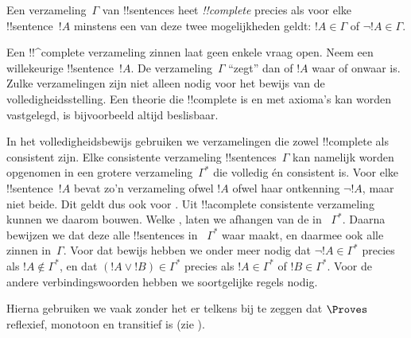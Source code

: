 \documentclass[../../../include/open-logic-section]{subfiles}
\begin{document}
      {}
      {}
      

\begin{defn}
 Een verzameling~$\Gamma$ van !!{sentence}s heet
\emph{!!{complete}} precies als voor elke !!{sentence}~$!A$ minstens een
van deze twee mogelijkheden geldt: $!A \in \Gamma$ of
$\lnot !A \in \Gamma$.
\end{defn}

\begin{explain}
Een !!^{complete} verzameling zinnen laat geen enkele vraag open. Neem
een willekeurige !!{sentence}~$!A$. De verzameling~$\Gamma$ ``zegt'' dan
of $!A$ waar of onwaar is. Zulke verzamelingen zijn niet alleen nodig
voor het bewijs van de volledigheidsstelling. Een theorie die !!{complete}
is en met axioma's kan worden vastgelegd, is bijvoorbeeld altijd
beslisbaar.
\end{explain}

\begin{explain}
In het volledigheidsbewijs gebruiken we verzamelingen die zowel
!!{complete} als consistent zijn. Elke consistente verzameling
!!{sentence}s~$\Gamma$ kan namelijk worden opgenomen in een grotere
verzameling~$\Gamma^*$ die volledig én consistent is. Voor elke
!!{sentence}~$!A$ bevat zo'n verzameling ofwel $!A$ ofwel haar ontkenning
$\lnot !A$, maar niet beide. Dit geldt dus ook voor
. Uit
!!a{complete} consistente verzameling kunnen we daarom
 bouwen. Welke
, laten we afhangen van de
 in
~$\Gamma^*$. Daarna bewijzen we dat deze
 alle !!{sentence}s in
~$\Gamma^*$ waar maakt, en daarmee ook alle zinnen in~$\Gamma$. Voor dat
bewijs hebben we onder meer nodig dat $\lnot !A \in \Gamma^*$ precies
als $!A \notin \Gamma^*$, en dat $(!A \lor !B) \in \Gamma^*$ precies
als $!A \in \Gamma^*$ of $!B \in \Gamma^*$. Voor de andere
verbindingswoorden hebben we soortgelijke regels nodig.
\end{explain}

Hierna gebruiken we vaak zonder het er telkens bij te zeggen dat
$\Proves$ reflexief, monotoon en transitief is (zie
).
\end{document}
